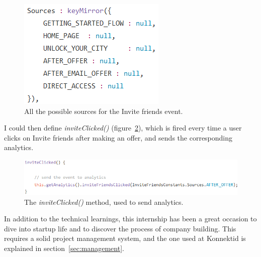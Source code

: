 \begin{figure}[H]
    \centering
    \includegraphics[scale=0.9]{figure/inviteFriendsConstants.png}
    \caption{All the possible sources for the \guillemotleft{} Invite friends \guillemotright{} event.}
    \label{fig:inviteFriendsConstants}
\end{figure}

I could then define \textit{inviteClicked()} ({\sc figure}~\ref{fig:inviteClicked}), which is fired every time a user clicks on \guillemotleft{} Invite friends \guillemotright{} after making an offer, and sends the corresponding analytics. 

\begin{figure}[H]
    \centering
    \includegraphics[scale=0.9]{figure/inviteClicked.png}
    \caption{The \textit{inviteClicked()} method, used to send analytics.}
    \label{fig:inviteClicked}
\end{figure}

In addition to the technical learnings, this internship has been a great occasion to dive into startup life and to discover the process of company building. This requires a solid project management system, and the one used at Konnektid is explained in {\sc section}~\ref{sec:management}.
